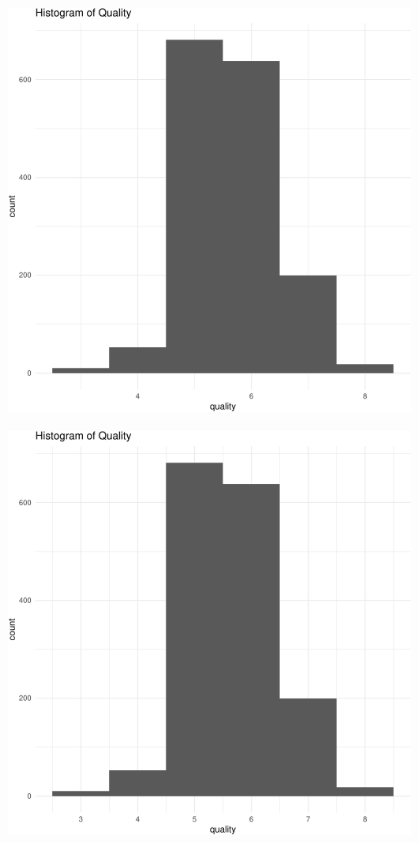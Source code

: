 \begin{frame}
\framebreak
 
\includegraphics[width=0.8\textwidth,height=0.7\textheight,keepaspectratio]{examples/ex-ggplot-02-crop.pdf}

\framebreak
 
\includegraphics[width=0.8\textwidth,height=0.7\textheight,keepaspectratio]{examples/ex-ggplot-03-crop.pdf}


\end{frame}
